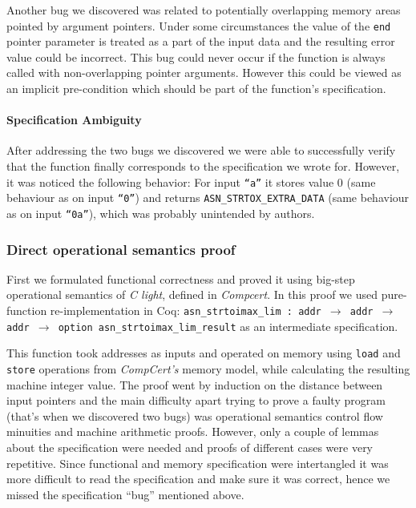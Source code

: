 \documentclass[acmsmall,nonacm]{acmart}
\begin{document}
Another bug we discovered was related to potentially overlapping
memory areas pointed by argument pointers. Under some circumstances
the value of the \texttt{end} pointer parameter is treated as a part
of the input data and the resulting error value could be
incorrect. This bug could never occur if the function is always called
with non-overlapping pointer arguments. However this could be viewed
as an implicit pre-condition which should be part of the function's
specification.

\paragraph{Specification Ambiguity}

After addressing the two bugs we discovered we were able to
successfully verify that the function finally corresponds to the
specification we wrote for. However, it was noticed the following
behavior: For input \texttt{``a''} it stores value 0 (same behaviour as on input \texttt{``0''}) and returns
{\color{green}\texttt{ASN\_STRTOX\_EXTRA\_DATA}} (same behaviour as on
input \texttt{``0a''}), which was probably unintended by authors.
  
\subsubsection{Direct operational semantics proof}

First we formulated functional correctness and proved it using
big-step operational semantics of \textit{C light}, defined in
\textit{Compcert}. In this proof we used pure-function
re-implementation in Coq: \texttt{asn\_strtoimax\_lim : addr $\rightarrow$
  addr $\rightarrow$ addr $\rightarrow$ option
  asn\_strtoimax\_lim\_result} as an intermediate specification.

This function took addresses as inputs and operated on memory using
\texttt{load} and \texttt{store} operations from \textit{CompCert's}
memory model, while calculating the resulting machine integer
value. The proof went by induction on the distance between input
pointers and the main difficulty apart trying to prove a faulty
program (that's when we discovered two bugs) was operational semantics
control flow minuities and machine arithmetic proofs. However, only a
couple of lemmas about the specification were needed and proofs of different cases were very repetitive. Since functional
and memory specification were intertangled it was more difficult to
read the specification and make sure it was correct, hence we missed the specification ``bug'' mentioned above. 
\end{document}
